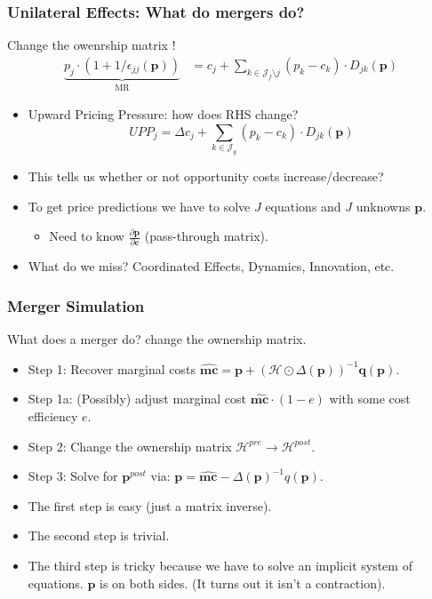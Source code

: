\begin{frame}
\frametitle{Unilateral Effects: What do mergers do?}
Change the owenrship matrix !
\begin{align*}
\underbrace{p_j\cdot\left(1+1/\epsilon_{jj}(\mathbf{p})\right)}_{\text{MR}} &=  c_j + \sum_{k \in \mathcal{J}_{f} \setminus j}  (p_k-c_k) \cdot  D_{jk} (\mathbf{p})
\end{align*}
\begin{itemize}
    \item \alert{Upward Pricing Pressure}: how does RHS change?
     $$UPP_j = \Delta c_j + \sum_{k \in \mathcal{J}_{g}}  (p_k-c_k) \cdot  D_{jk} (\mathbf{p})$$
     \item This tells us whether or not \alert{opportunity costs} increase/decrease?
     \item To get price predictions we have to solve $J$ equations and $J$ unknowns $\mathbf{p}$.
     \begin{itemize}
        \item Need to know $\frac{\partial \mathbf{p}}{\partial \mathbf{c}}$ (pass-through matrix).
    \end{itemize}
    \item What do we miss? \alert{Coordinated Effects}, \alert{Dynamics}, \alert{Innovation}, etc.
\end{itemize}
\end{frame}



\begin{frame}
\frametitle{Merger Simulation}
What does a merger do? \alert{change the ownership matrix}.
\begin{itemize}

\item Step 1: Recover marginal costs $\widehat{\mathbf{mc}} = \mathbf{p} +(\mathcal{H} \odot \Delta(\mathbf{p}))^{-1} \mathbf{q}(\mathbf{p})$.
\item Step 1a: (Possibly) adjust marginal cost $\widehat{\mathbf{mc}}\cdot (1-e)$ with some cost efficiency $e$.
\item Step 2: Change the ownership matrix $\mathcal{H}^{pre} \rightarrow \mathcal{H}^{post}$.
\item Step 3: Solve for $\mathbf{p}^{post}$ via: $\mathbf{p} = \widehat{\mathbf{mc}} - \Delta(\mathbf{p})^{-1}q(\mathbf{p})$.
\end{itemize}
\pause
\vspace{0.5cm}
\begin{itemize}
\item The first step is easy (just a matrix inverse).
\item The second step is trivial.
\item The third step is tricky because we have to solve an implicit system of equations. $\mathbf{p}$ is on both sides. (It turns out it isn't a contraction).
\end{itemize}
\end{frame}



